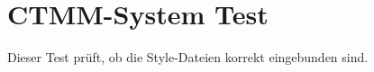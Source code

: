 \documentclass[a4paper,12pt]{article}
\begin{document}
\section*{CTMM-System Test}
\textcolor{ctmmBlue}{Dieser Test prüft, ob die Style-Dateien korrekt eingebunden sind.}

% 
\end{document}

